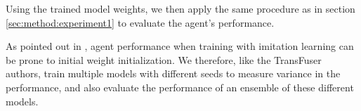 Using the trained model weights,
we then apply the same procedure as in section \ref{sec:method:experiment1}
to evaluate the agent's performance.

As pointed out in \cite{transfuser-pami},
agent performance when training with imitation learning
can be prone to initial weight initialization.
We therefore, like the TransFuser authors,
train multiple models with different seeds to measure variance in the performance,
and also evaluate the performance of an ensemble of these different models.
